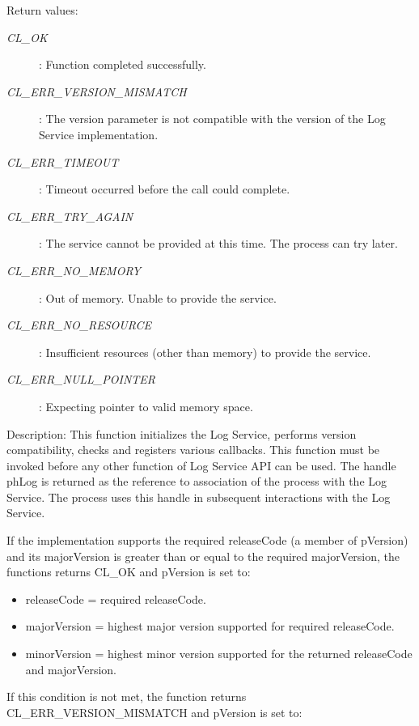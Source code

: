 \begin{flushleft}
\begin{Desc}
\begin{description}
\end{description}
\end{Desc}
\begin{Desc}
\item[Return values:]
\begin{description}
\item[{\em CL\_\-OK}]: Function completed successfully.
\item[{\em CL\_\-ERR\_\-VERSION\_\-MISMATCH}]: The version parameter is not compatible with the version of the Log Service implementation.
\item[{\em CL\_\-ERR\_\-TIMEOUT}]: Timeout occurred before the call could complete.
\item[{\em CL\_\-ERR\_\-TRY\_\-AGAIN}]: The service cannot be provided at this time. The process can try later.
\item[{\em CL\_\-ERR\_\-NO\_\-MEMORY}]: Out of memory. Unable to provide the service.
\item[{\em CL\_\-ERR\_\-NO\_\-RESOURCE}]: Insufficient resources (other than memory) to provide the service.
\item[{\em CL\_\-ERR\_\-NULL\_\-POINTER}]: Expecting pointer to valid memory space.
\end{description}
\end{Desc}
\begin{Desc}
\item[Description:] This function initializes the Log Service, performs version compatibility, checks and registers various 
callbacks. This function must be invoked before any other function of Log Service API can be used. The handle phLog is returned as the reference to
association of the process with the Log Service. The process uses this handle in subsequent interactions with the Log Service.
\par
If the implementation supports the required releaseCode (a member of pVersion) and its majorVersion is greater than or equal to the required 
majorVersion, the functions returns CL\_\-OK and pVersion is set to:
\begin{itemize}
\item
releaseCode = required releaseCode.
\item
majorVersion = highest major version supported for required releaseCode.
\item
minorVersion = highest minor version supported for the returned releaseCode and majorVersion.
\end{itemize}
If this condition is not met, the function returns CL\_\-ERR\_\-VERSION\_\-MISMATCH and pVersion is set to:

\end{Desc}
\end{flushleft}
